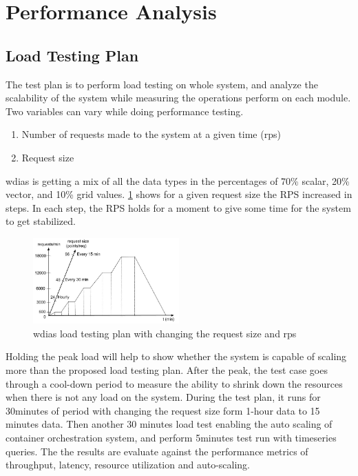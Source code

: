 \documentclass[conference]{IEEEtran}
\begin{document}
\section{Performance Analysis}
\label{pse:performance_analysis}

\subsection{Load Testing Plan}
\label{psubse:test_plan}

The test plan is to perform load testing on whole system, and analyze the scalability of the system while measuring the operations perform on each module. Two variables can vary while doing performance testing.
\begin{enumerate}
    \item Number of requests made to the system at a given time (\acrfull{rps})
    \item Request size
\end{enumerate}

\acrshort{wdias} is getting a mix of all the data types in the percentages of 70\% scalar, 20\% vector, and 10\% grid values. \cref{pfi:performance_study} shows for a given request size the RPS increased in steps. In each step, the RPS holds for a moment to give some time for the system to get stabilized.

\begin{figure}[htbp]
\centerline{\includegraphics[width=0.5\textwidth]{results/work_load/performance_study_v4.jpg}}
\caption{\acrshort{wdias} load testing plan with changing the request size and \acrshort{rps}}
\label{pfi:performance_study}
\end{figure}

Holding the peak load will help to show whether the system is capable of scaling more than the proposed load testing plan. After the peak, the test case goes through a cool-down period to measure the ability to shrink down the resources when there is not any load on the system. During the test plan, it runs for 30minutes of period with changing the request size form 1-hour data to 15 minutes data. Then another 30 minutes load test enabling the auto scaling of container orchestration system, and perform 5minutes test run with timeseries queries. The the results are evaluate against the performance metrics of throughput, latency, resource utilization and auto-scaling.
\end{document}
